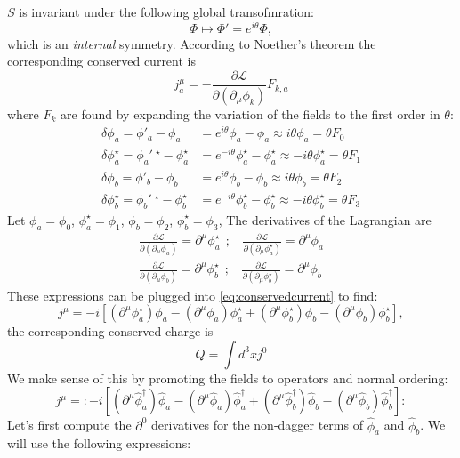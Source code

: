 $S$ is invariant under the following global transofmration:
\begin{equation}
    \Phi \mapsto \Phi' = e^{i\theta}\Phi , 
\end{equation}
which is an \textit{internal} symmetry.
According to Noether's theorem the corresponding conserved current is 
\begin{equation}
    j^\mu_a = -\frac{\partial \mathcal L}{\partial ( \partial_\mu \phi_k)} F_{k,a} \label{eq:conservedcurrent}
\end{equation}
where $F_k$ are found by expanding the variation of the fields to the first order in $\theta$:
\begin{align*}
\delta \phi_a = \phi'_a - \phi_a &= e^{i\theta } \phi_a - \phi_a \approx i \theta \phi_a = \theta F_0 \\
\delta \phi_a^\star = \phi_a'~^\star - \phi_a^\star &= e^{-i\theta } \phi_a^\star - \phi_a^\star \approx -i \theta \phi_a^\star = \theta F_1 \\
\delta \phi_b = \phi'_b - \phi_b &= e^{i\theta } \phi_b - \phi_b \approx i \theta \phi_b = \theta F_2 \\
\delta \phi_b^\star = \phi_b'~^\star - \phi_b^\star &= e^{-i\theta } \phi_b^\star - \phi_b^\star \approx -i \theta \phi_b^\star = \theta F_3
\end{align*}
Let $\phi_a = \phi_0$, $\phi_a ^\star= \phi_1$,
$\phi_b = \phi_2$, $\phi_b ^\star= \phi_3$,
The derivatives of the Lagrangian are 
\begin{align}
    \frac{\partial \mathcal L}{\partial(\partial_\mu \phi_a)}= \partial^\mu \phi_a^\star~~;~~~~
    \frac{\partial \mathcal L}{\partial(\partial_\mu \phi_a^\star)}= \partial^\mu \phi_a \label{eq:dLddmuphiA} \\
        \frac{\partial \mathcal L}{\partial(\partial_\mu \phi_b)}= \partial^\mu \phi_b^\star~~;~~~~
    \frac{\partial \mathcal L}{\partial(\partial_\mu \phi_b^\star)}= \partial^\mu \phi_b\label{eq:dLddmuphiB}
\end{align}
These expressions can be plugged into \eqref{eq:conservedcurrent} to find:
\begin{equation}
    j^\mu = - i \left[(\partial^\mu \phi_a^\star)\phi_a- (\partial^\mu \phi_a) \phi_a^\star + (\partial ^\mu \phi_b^\star) \phi_b - (\partial ^\mu \phi_b ) \phi_b^\star\right],
\end{equation}
the corresponding conserved charge is
\begin{equation}
    Q = \int d^3 x j^0
\end{equation}
We make sense of this by promoting the fields to operators
and normal ordering:
\begin{equation}
j^\mu = : -i \left[ (\partial^\mu \hat{\phi}_a^\dagger)\hat{\phi}_a - (\partial^\mu \hat{\phi}_a)\hat{\phi}_a^\dagger + (\partial^\mu \hat{\phi}_b^\dagger)\hat{\phi}_b - (\partial^\mu \hat{\phi}_b)\hat{\phi}_b^\dagger  \right]:
\label{eq:conserved_charge_0}
\end{equation}
Let's first compute the \(\partial^0\) derivatives for the non-dagger terms of \(\hat{\phi}_a\) and \(\hat{\phi}_b\). We will use the following expressions:

